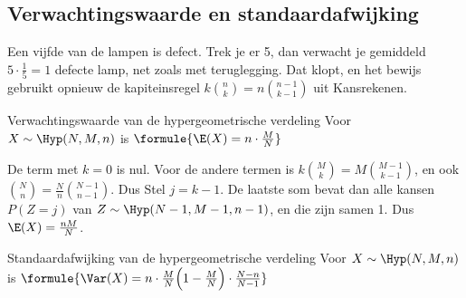 
\begin{oefeningen}
\end{oefeningen}

\subsection{Verwachtingswaarde en standaardafwijking}

Een vijfde van de lampen is defect. Trek je er 5, dan verwacht je gemiddeld $5 \cdot \frac15 = 1$ defecte lamp, net zoals met teruglegging. Dat klopt, en het bewijs gebruikt opnieuw de kapiteinsregel $k\binom{n}{k} = n\binom{n-1}{k-1}$ uit Kansrekenen.

\begin{theorie}
\begin{stelling}{Verwachtingswaarde van de hypergeometrische verdeling}
Voor $X \sim \Hyp(N, M, n)$ is \quad $\formule{\E(X) = n \cdot \frac{M}{N}}$
\end{stelling}

\begin{bewijs}
De term met $k = 0$ is nul. Voor de andere termen is $k\binom{M}{k} = M\binom{M-1}{k-1}$, en ook $\binom{N}{n} = \frac{N}{n}\binom{N-1}{n-1}$. Dus
Stel $j = k - 1$. De laatste som bevat dan alle kansen $P(Z = j)$ van \mbox{$Z \sim \Hyp(N - 1, M - 1, n - 1)$}, en die zijn samen 1. Dus $\E(X) = \frac{nM}{N}$.
\end{bewijs}

\begin{stelling}{Standaardafwijking van de hypergeometrische verdeling}
Voor $X \sim \Hyp(N, M, n)$ is \quad $\formule{\Var(X) = n \cdot \frac{M}{N}\Bigl(1 - \frac{M}{N}\Bigr) \cdot \frac{N - n}{N - 1}}$
\end{stelling}
\end{theorie}

